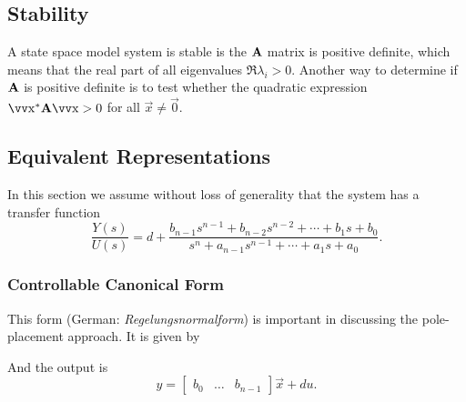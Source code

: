 \subsection{Stability} \label{sec:stability}

A state space model system is stable is the \(\bm{\mathrm{A}}\) matrix is positive definite, which means that the real part of all eigenvalues \(\Re{\lambda_i} > 0\). Another way to determine if \(\bm{\mathrm{A}}\) is positive definite is to test whether the quadratic expression \(\vec{x}^* \mx{A} \vec{x} > 0\) for all \(\vec{x} \neq \vec{0}\).

\subsection{Equivalent Representations}

In this section we assume without loss of generality that the system has a transfer function
\[
	\frac{Y(s)}{U(s)} = d + \frac{
		b_{n-1} s^{n-1} + b_{n-2} s^{n-2} + \cdots + b_1 s + b_0
	}{
		s^n + a_{n-1} s^{n-1} + \cdots + a_1 s + a_0
	}.
\]

\subsubsection{Controllable Canonical Form}

This form (German: \textsl{Regelungsnormalform}) is important in discussing the pole-placement approach. It is given by

\par\vspace{.5em}\noindent{}
And the output is
\[
	y =
	\begin{bmatrix}
		b_0 & \dots & b_{n-1}
	\end{bmatrix}
	\vec{x}
	+ d u
	.
\]

